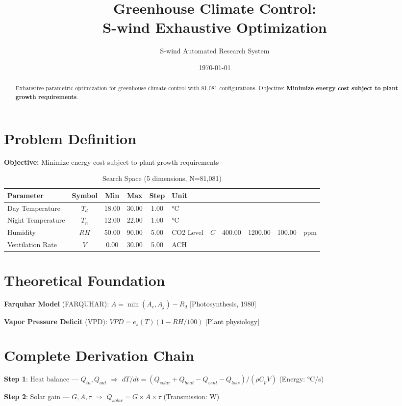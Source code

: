 \documentclass[11pt,twocolumn]{article}
\title{Greenhouse Climate Control: \\S-wind Exhaustive Optimization}
\author{S-wind Automated Research System}
\date{\today}
\begin{document}
\maketitle

\begin{abstract}
Exhaustive parametric optimization for greenhouse climate control with 81,081 configurations.
Objective: \textbf{Minimize energy cost subject to plant growth requirements}.
\end{abstract}

\section{Problem Definition}
\textbf{Objective:} Minimize energy cost subject to plant growth requirements

\begin{table}[h]
\centering
\caption{Search Space (5 dimensions, N=81,081)}
\begin{tabular}{@{}lccccl@{}}
\toprule
Parameter & Symbol & Min & Max & Step & Unit \\
\midrule
Day Temperature & $T_d$ & 18.00 & 30.00 & 1.00 & °C \\
Night Temperature & $T_n$ & 12.00 & 22.00 & 1.00 & °C \\
Humidity & $RH$ & 50.00 & 90.00 & 5.00 & %
CO2 Level & $C$ & 400.00 & 1200.00 & 100.00 & ppm \\
Ventilation Rate & $V$ & 0.00 & 30.00 & 5.00 & ACH \\
\bottomrule
\end{tabular}
\end{table}

\section{Theoretical Foundation}
\textbf{Farquhar Model} (FARQUHAR): $A = \min(A_c, A_j) - R_d$ [Photosynthesis, 1980]

\textbf{Vapor Pressure Deficit} (VPD): $VPD = e_s(T)(1-RH/100)$ [Plant physiology]


\section{Complete Derivation Chain}
\textbf{Step 1}: Heat balance --- $Q_{in}, Q_{out}$ $\Rightarrow$ $dT/dt = (Q_{solar} + Q_{heat} - Q_{vent} - Q_{loss})/(\rho C_p V)$ (Energy: °C/s)


\textbf{Step 2}: Solar gain --- $G, A, \tau$ $\Rightarrow$ $Q_{solar} = G \times A \times \tau$ (Transmission: W)
\end{document}
